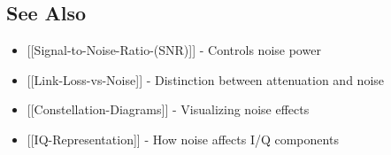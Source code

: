 \subsection{See Also}\label{see-also}

\begin{itemize}
\tightlist
\item
  {[}{[}Signal-to-Noise-Ratio-(SNR){]}{]} - Controls noise power
\item
  {[}{[}Link-Loss-vs-Noise{]}{]} - Distinction between attenuation and
  noise
\item
  {[}{[}Constellation-Diagrams{]}{]} - Visualizing noise effects
\item
  {[}{[}IQ-Representation{]}{]} - How noise affects I/Q components
\end{itemize}
